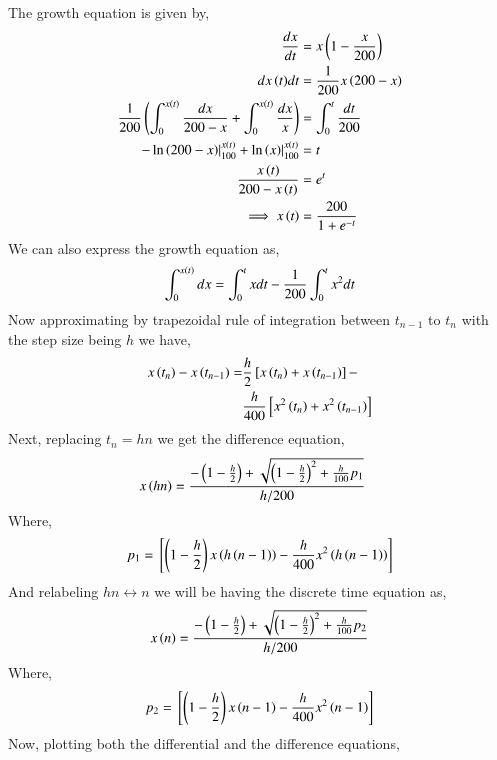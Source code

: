 \documentclass[journal,12pt,twocolumn]{IEEEtran}
\theoremstyle{remark}
\begin{document}
\solution

The growth equation is given by,
\begin{align}
	\frac{dx}{dt}&=x\left(1-\frac{x}{200}\right) \\
	{dx\left(t\right)}{dt}&=\frac{1}{200}x\left(200-x\right) \\
	\frac{1}{200}\left(\int_{0}^{x\left(t\right)}\frac{dx}{200-x}+\int_{0}^{x\left(t\right)}\frac{dx}{x}\right)&=\int_{0}^{t}\frac{dt}{200} \\
	-\ln{\ensuremath{\left(200-x\right)}}|_{100}^{x\left(t\right)}+\ln{\ensuremath{\left(x\right)}}|_{100}^{x\left(t\right)}&=t \\
	\frac{x\left(t\right)}{200-x\left(t\right)}&=e^t \\
	\implies x\left(t\right)&=\frac{200}{1+e^{-t}}
\end{align}
We can also express the growth equation as,
\begin{align}
    \int_{0}^{x\left(t\right)}dx=\int_{0}^{t}xdt-\frac{1}{200}\int_{0}^{t}x^2dt
\end{align}
Now approximating by trapezoidal rule of integration between $t_{n-1}$ to $t_n$ with the step size being $h$ we have,
\begin{align}
    \begin{split}
        x\left(t_n\right)-x\left(t_{n-1}\right)=&\frac{h}{2}{}\left[x\left(t_n\right)+x\left(t_{n-1}\right)\right]- \\
        &\frac{h}{400}{}\left[x^2\left(t_n\right)+x^2\left(t_{n-1}\right)\right]
    \end{split}
\end{align}
Next, replacing $t_{n}=hn$ we get the difference equation,
\begin{align}
    &x\left(hn\right)=\frac{-\left(1-\frac{h}{2}\right)+\sqrt{\left(1-\frac{h}{2}\right)^2+\frac{h}{100}p_1}}{h/200}
\end{align}
Where,
\begin{align}
    p_1={}\left[\left(1-\frac{h}{2}\right)x\left(h\left(n-1\right)\right)-\frac{h}{400}x^2\left(h\left(n-1\right)\right)\right]
\end{align}
And relabeling $hn\longleftrightarrow n$ we will be having the discrete time equation as,
\begin{align}
    x\left(n\right)=\frac{-\left(1-\frac{h}{2}\right)+\sqrt{\left(1-\frac{h}{2}\right)^2+\frac{h}{100}p_2}}{h/200} \label{eq:A}
\end{align}
Where,
\begin{align}
    p_2={}\left[\left(1-\frac{h}{2}\right)x\left(n-1\right)-\frac{h}{400}x^2\left(n-1\right)\right]
\end{align}
Now, plotting both the differential and the difference equations,
\end{document}
